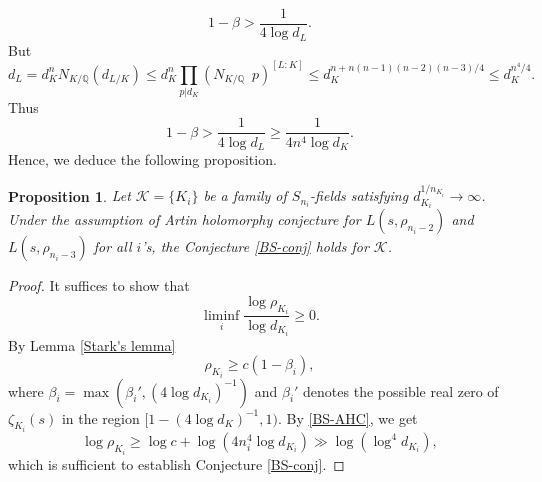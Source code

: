 \documentclass[12pt]{amsart}
\newtheorem{theorem}{Theorem}[section]
\newtheorem{proposition}[theorem]{Proposition}
\theoremstyle{definition}
\newcommand{\Q}{\mathbb{Q}}
\newcommand{\rK}{\mathcal{K}}
\begin{document}
    \begin{equation*}
        1-\beta > \frac{1}{4\log d_L}.
    \end{equation*}
But
\begin{equation*}
        d_L = d_K^n  N_{K/\Q} (d_{L/K}) \leq d_K^n \prod_{p|d_K} (N_{K/\Q}\,\,\, p)^{[L:K]} \leq d_K^{n+ n(n-1)(n-2)(n-3)/4}\leq d_K^{n^4/4}.
\end{equation*}
Thus
    \begin{equation}\label{BS-AHC}
        1-\beta > \frac{1}{4\log d_L} \geq \frac{1}{4 n^4 \log d_K}.
    \end{equation}
Hence, we deduce the following proposition.




   
   
    
    
    
    

\begin{proposition}
    Let $\rK=\{K_i\}$ be a family of $S_{n_i}$-fields satisfying $d_{K_i}^{1/n_{K_i}} \to \infty$. Under the assumption of Artin holomorphy conjecture for $L(s,\rho_{n_i-2})$ and $L(s,\rho_{n_i-3})$ for all $i$'s, the Conjecture \ref{BS-conj} holds for $\rK$.
\end{proposition}

\begin{proof}
     It suffices to show that 
    \begin{equation*}
        \liminf_i \frac{\log \rho_{K_i}}{\log d_{K_i}} \geq 0.
    \end{equation*}
    By Lemma \ref{Stark's lemma}
    \begin{equation*}
        \rho_{K_i} \geq c (1-\beta_i),
    \end{equation*}
    where $\beta_i = \max(\beta_i', (4\log d_{K_i})^{-1}) $ and $\beta_i'$ denotes the possible real zero of $\zeta_{K_i}(s)$ in the region $[1-(4\log d_K)^{-1},1)$. By \eqref{BS-AHC}, we get
    \begin{equation*}
        \log \rho_{K_i} \geq \log c + \log (4n_i^4 \log d_{K_i}) \gg \log (\log^4 d_{K_i}),
    \end{equation*}
    which is sufficient to establish Conjecture \ref{BS-conj}.
\end{proof}
\bigskip
\end{document}
